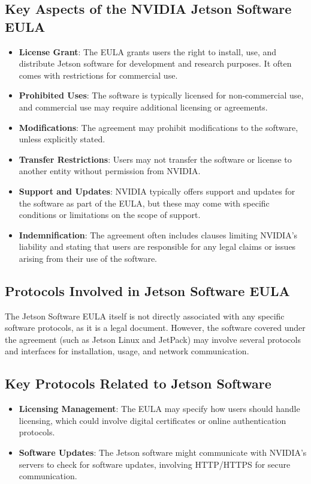 \subsection*{Key Aspects of the NVIDIA Jetson Software EULA}
\begin{itemize}
	\item \textbf{License Grant}: The EULA grants users the right to install, use, and distribute Jetson software for development and research purposes. It often comes with restrictions for commercial use.
	\item \textbf{Prohibited Uses}: The software is typically licensed for non-commercial use, and commercial use may require additional licensing or agreements.
	\item \textbf{Modifications}: The agreement may prohibit modifications to the software, unless explicitly stated.
	\item \textbf{Transfer Restrictions}: Users may not transfer the software or license to another entity without permission from NVIDIA.
	\item \textbf{Support and Updates}: NVIDIA typically offers support and updates for the software as part of the EULA, but these may come with specific conditions or limitations on the scope of support.
	\item \textbf{Indemnification}: The agreement often includes clauses limiting NVIDIA’s liability and stating that users are responsible for any legal claims or issues arising from their use of the software.
\end{itemize}

\subsection*{Protocols Involved in Jetson Software EULA}
The Jetson Software EULA itself is not directly associated with any specific software protocols, as it is a legal document. However, the software covered under the agreement (such as Jetson Linux and JetPack) may involve several protocols and interfaces for installation, usage, and network communication.

\subsection*{Key Protocols Related to Jetson Software}
\begin{itemize}
	\item \textbf{Licensing Management}: The EULA may specify how users should handle licensing, which could involve digital certificates or online authentication protocols.
	\item \textbf{Software Updates}: The Jetson software might communicate with NVIDIA’s servers to check for software updates, involving HTTP/HTTPS for secure communication.
\end{itemize}

